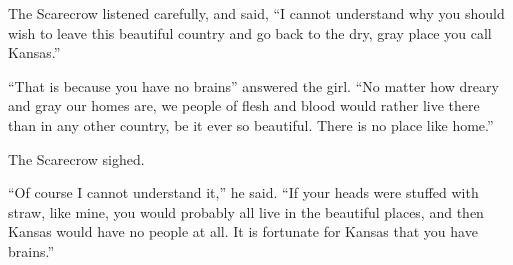 \documentclass{article}
\begin{document}
The Scarecrow listened carefully, and said, ``I cannot understand why
you should wish to leave this beautiful country and go back to the dry,
gray place you call Kansas.''

``That is because you have no brains'' answered the girl. ``No matter
how dreary and gray our homes are, we people of flesh and blood would
rather live there than in any other country, be it ever so beautiful.
There is no place like home.''

The Scarecrow sighed.
\THEERRORISHERE

``Of course I cannot understand it,'' he said. ``If your heads were
stuffed with straw, like mine, you would probably all live in the
beautiful places, and then Kansas would have no people at all. It is
fortunate for Kansas that you have brains.'' 
\end{document}
